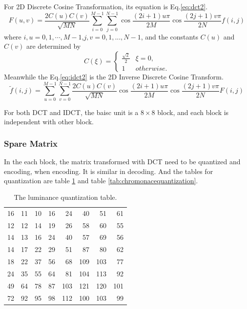 \documentclass{article}
\begin{document}
For 2D Discrete Cosine Transformation, its equation is Eq.\ref{eq:dct2}.
\begin{equation}
\label{eq:dct2}
F(u,v) = \frac{2C(u)C(v)}{\sqrt{MN}}\sum\limits_{i=0}^{M-1}\sum\limits_{j=0}^{N-1}\cos{\frac{(2i+1)u\pi}{2M}}\cos{\frac{(2j+1)v\pi}{2N}}f(i,j)
\end{equation}
where $i,u=0,1,\cdots,M-1$,$j,v=0,1,...,N-1$, and the constants $C(u)$ and $C(v)$ are determined by
\begin{equation}
\label{eq:2dct}
C(\xi) = \left\{
\begin{array}{cc}
\frac{\sqrt{2}}{2} & \xi = 0, \\
1 & otherwise.
\end{array}\right.
\end{equation}
Meanwhile the Eq.\ref{eq:idct2} is the 2D Inverse Discrete Cosine Transform.
\begin{equation}
\label{eq:idct2}
\widetilde{f}(i,j) = \sum\limits_{u=0}^{M-1}\sum\limits_{v=0}^{N-1}\frac{2C(u)C(v)}{\sqrt{MN}}\cos{\frac{(2i+1)u\pi}{2M}}\cos{\frac{(2j+1)v\pi}{2N}}F(i,j)
\end{equation} 

For both DCT and IDCT, the baisc unit is a $8 \times 8$ block, and each block is independent with other block.

\subsubsection{Spare Matrix}
\label{sec:hpeg:inside:sparematrix}

In the each block, the matrix transformed with DCT need to be quantized and encoding, when encoding.
It is similar in decoding. And the tables for quantization are table \ref{tab:luminacequantization} and
table \ref{tab:chromonacequantization}.

\begin{table}
    \centering
    \caption{The luminance quantization table.}
    \begin{tabular}{rrrrrrrr}
        \hline
        16 & 11 & 10 & 16 & 24 & 40 & 51 & 61 \\ 
        12 & 12 & 14 & 19 & 26 & 58 & 60 & 55 \\ 
        14 & 13 & 16 & 24 & 40 & 57 & 69 & 56 \\ 
        14 & 17 & 22 & 29 & 51 & 87 & 80 & 62 \\ 
        18 & 22 & 37 & 56 & 68 & 109 & 103 & 77 \\ 
        24 & 35 & 55 & 64 & 81 & 104 & 113 & 92 \\ 
        49 & 64 & 78 & 87 & 103 & 121 & 120 & 101 \\ 
        72 & 92 & 95 & 98 & 112 & 100 & 103 & 99 \\
        \hline
    \end{tabular}
    \label{tab:luminacequantization}
\end{table}
\end{document}
